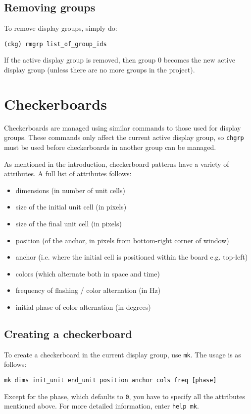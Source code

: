 \documentclass[12pt,titlepage]{article}
\newenvironment{compactemize}
{\begin{itemize}
  \setlength{\itemsep}{1.5pt}
  \setlength{\parskip}{0pt}
  \setlength{\parsep}{0pt}}
{\end{itemize}}
\begin{document}
\subsection{Removing groups}
To remove display groups, simply do:
\begin{lstlisting}
(ckg) rmgrp list_of_group_ids
\end{lstlisting}
If the active display group is removed, then group 0 becomes the new
active display group (unless there are no more groups in the project).

\section{Checkerboards}

Checkerboards are managed using similar commands to those used for
display groups. These commands only affect the current active display
group, so \texttt{chgrp} must be used before checkerboards in another
group can be managed.

As mentioned in the introduction, checkerboard patterns have a variety
of attributes. A full list of attributes follows:
\begin{compactemize}
\item dimensions (in number of unit cells)
\item size of the initial unit cell (in pixels)
\item size of the final unit cell (in pixels)
\item position (of the anchor, in pixels from bottom-right corner of window)
\item anchor (i.e. where the initial cell is positioned within the board
  e.g. top-left)
\item colors (which alternate both in space and time)
\item frequency of flashing / color alternation (in Hz)
\item initial phase of color alternation (in degrees)
\end{compactemize}

\subsection{Creating a checkerboard}
To create a checkerboard in the current display group, use
\texttt{mk}. The usage is as follows:
\begin{lstlisting}
mk dims init_unit end_unit position anchor cols freq [phase]
\end{lstlisting}
Except for the phase, which defaults to \texttt{0}, you have to
specify all the attributes mentioned above. For more detailed
information, enter \texttt{help mk}.
\end{document}
